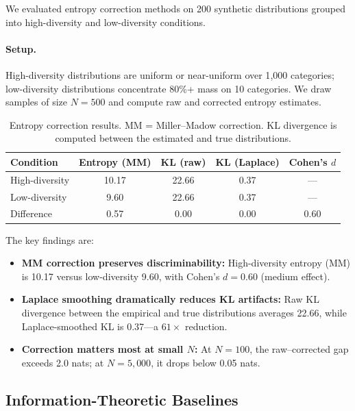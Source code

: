 \documentclass[11pt,a4paper]{article}
\begin{document}
We evaluated entropy correction methods on 200
synthetic distributions grouped into high-diversity
and low-diversity conditions.

\paragraph{Setup.}
High-diversity distributions are uniform or near-uniform
over 1{,}000 categories; low-diversity distributions
concentrate 80\%+ mass on 10 categories.  We draw
samples of size $N = 500$ and compute raw and corrected
entropy estimates.

\begin{table}[t]
\centering
\caption{Entropy correction results.  MM = Miller--Madow
correction.  KL divergence is computed between the
estimated and true distributions.}
\label{tab:entropy}
\begin{tabular}{@{}lcccc@{}}
\toprule
Condition & Entropy (MM) & KL (raw) & KL (Laplace) & Cohen's $d$ \\
\midrule
High-diversity & 10.17 & 22.66 & 0.37 & --- \\
Low-diversity  &  9.60 & 22.66 & 0.37 & --- \\
\midrule
Difference & 0.57 & 0.00 & 0.00 & 0.60 \\
\bottomrule
\end{tabular}
\end{table}

The key findings are:
\begin{itemize}[leftmargin=2em,itemsep=2pt]
\item \textbf{MM correction preserves discriminability:}
      High-diversity entropy (MM) is 10.17 versus
      low-diversity 9.60, with Cohen's $d = 0.60$
      (medium effect).
\item \textbf{Laplace smoothing dramatically reduces
      KL artifacts:} Raw KL divergence between the
      empirical and true distributions averages 22.66,
      while Laplace-smoothed KL is 0.37---a $61\times$
      reduction.
\item \textbf{Correction matters most at small $N$:}
      At $N = 100$, the raw--corrected gap exceeds 2.0
      nats; at $N = 5{,}000$, it drops below 0.05 nats.
\end{itemize}

\subsection{Information-Theoretic Baselines}\label{sec:exp_it}
\end{document}
